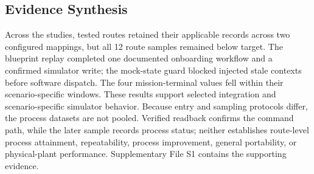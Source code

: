 \subsection{Evidence Synthesis}
Across the studies, tested routes retained their applicable records across two
configured mappings, but all 12 route samples remained below target. The
blueprint replay completed one documented onboarding workflow and a confirmed
simulator write; the mock-state guard blocked injected stale contexts before
software dispatch. The four mission-terminal values fell within their
scenario-specific windows. These results support selected integration and
scenario-specific simulator behavior. Because entry and sampling protocols
differ, the process datasets are not pooled. Verified readback confirms the
command path, while the later sample records process status; neither establishes
route-level process attainment, repeatability, process improvement, general
portability, or physical-plant performance. Supplementary File S1 contains the
supporting evidence.
